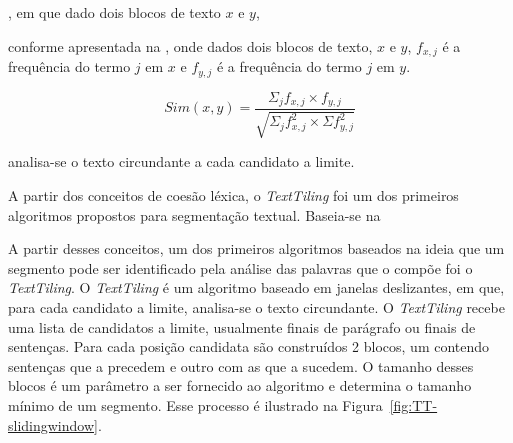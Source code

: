 {, em que dado dois blocos de texto $x$ e $y$,

conforme apresentada na , onde dados dois blocos de texto, $x$ e $y$, $f_{x,j}$ é a frequência do termo $j$ em $x$ e $f_{y,j}$ é a frequência do termo $j$ em $y$.

\begin{equation}
	Sim(x,y) = \frac
	{\Sigma_j f_{x,j} \times f_{y,j}}
	{\sqrt{\Sigma_j f^2_{x,j} \times \Sigma f^2_{y,j}}}
	\label{equ:cosine}
\end{equation}




analisa-se o texto circundante a cada candidato a limite.




A partir dos conceitos de coesão léxica, o \textit{TextTiling} foi um dos primeiros algoritmos propostos para segmentação textual. Baseia-se na

A partir desses conceitos, um dos primeiros algoritmos baseados na ideia que um segmento pode ser identificado pela análise das palavras que o compõe foi o \textit{TextTiling}. O \textit{TextTiling} é um algoritmo baseado em janelas deslizantes, em  que, para cada candidato a limite, analisa-se o texto circundante. O \textit{TextTiling} recebe uma lista de candidatos a limite, usualmente finais de parágrafo ou finais de sentenças. Para cada posição candidata são construídos 2 blocos, um contendo sentenças que a precedem e outro com as que a sucedem. O tamanho desses blocos é um parâmetro a ser fornecido ao algoritmo e determina o tamanho mínimo de um segmento. Esse processo é ilustrado na Figura~\ref{fig:TT-slidingwindow}.






% 









}

